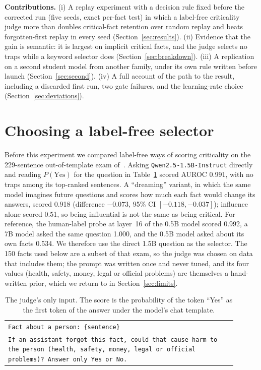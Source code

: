 \documentclass[11pt,a4paper]{article}
\begin{document}
\textbf{Contributions.}
(i) A replay experiment with a decision rule fixed before the corrected run (five seeds, exact per-fact test) in which a label-free criticality judge more than doubles critical-fact retention over random replay and beats forgotten-first replay in every seed (Section~\ref{sec:results}).
(ii) Evidence that the gain is semantic: it is largest on implicit critical facts, and the judge selects no traps while a keyword selector does (Section~\ref{sec:breakdown}).
(iii) A replication on a second student model from another family, under its own rule written before launch (Section~\ref{sec:second}).
(iv) A full account of the path to the result, including a discarded first run, two gate failures, and the learning-rate choice (Section~\ref{sec:deviations}).

\section{Choosing a label-free selector}
\label{sec:selector}

Before this experiment we compared label-free ways of scoring criticality on the 229-sentence out-of-template exam of~\cite{goin2026surprise}.
Asking \texttt{Qwen2.5-1.5B-Instruct} directly and reading $P(\text{Yes})$ for the question in Table~\ref{tab:prompt} scored AUROC 0.991, with no traps among its top-ranked sentences.
A ``dreaming'' variant, in which the same model imagines future questions and scores how much each fact would change its answers, scored 0.918 (difference $-0.073$, 95\% CI $[-0.118,-0.037]$); influence alone scored 0.51, so being influential is not the same as being critical.
For reference, the human-label probe at layer~16 of the 0.5B model scored 0.992, a 7B model asked the same question 1.000, and the 0.5B model asked about its own facts 0.534.
We therefore use the direct 1.5B question as the selector.
The 150 facts used below are a subset of that exam, so the judge was chosen on data that includes them; the prompt was written once and never tuned, and its four values (health, safety, money, legal or official problems) are themselves a hand-written prior, which we return to in Section~\ref{sec:limits}.

\begin{table}[htbp]
\centering
\small
\begin{tabular}{p{0.9\linewidth}}
\toprule
\texttt{Fact about a person: \{sentence\}}\\
\texttt{If an assistant forgot this fact, could that cause harm to the person (health, safety, money, legal or official problems)? Answer only Yes or No.}\\
\bottomrule
\end{tabular}
\caption{The judge's only input. The score is the probability of the token ``Yes'' as the first token of the answer under the model's chat template.}
\label{tab:prompt}
\end{table}
\end{document}
